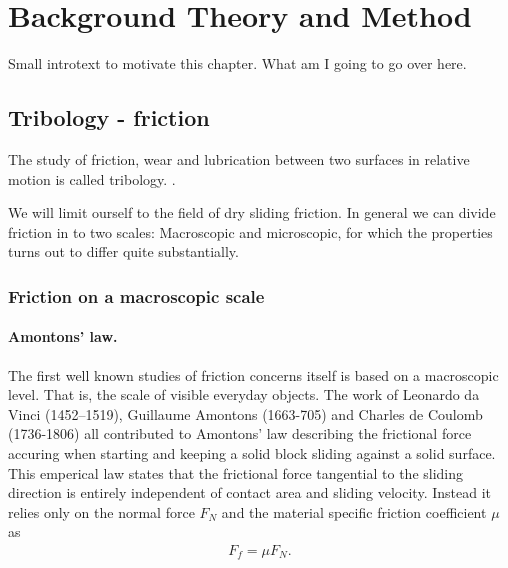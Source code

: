 \newpage
\chapter{Background Theory and Method}

Small introtext to motivate this chapter. What am I going to go over here.


\section{Tribology - friction}

The study of friction, wear and lubrication between two surfaces in relative motion is called tribology. \cite{gnecco_meyer_2015}.

We will limit ourself to the field of dry sliding friction. In general we can divide friction in to two scales: Macroscopic and microscopic, for which the properties turns out to differ quite substantially. 



\subsection{Friction on a macroscopic scale}
\subsubsection {Amontons’ law. }
The first well known studies of friction concerns itself is based on a macroscopic level. That is, the scale of visible everyday objects. The work of Leonardo da Vinci (1452–1519), Guillaume Amontons (1663-705) and Charles de Coulomb (1736-1806) all contributed to Amontons’ law describing the frictional force accuring when starting and keeping a solid block sliding against a solid surface. This emperical law states that the frictional force tangential to the sliding direction is entirely independent of contact area and sliding velocity. Instead it relies only on the normal force $F_N$ and the material specific friction coefficient $\mu$ as
\begin{align*}
  F_f = \mu F_N.
\end{align*}

